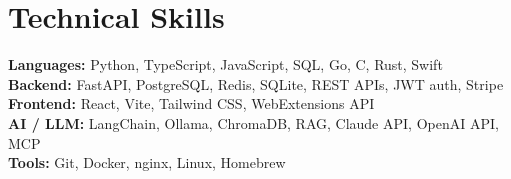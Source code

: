 \documentclass[letterpaper,10pt]{article}
\begin{document}
\section{Technical Skills}
 \begin{itemize}[leftmargin=0.15in, label={}]
    \small{\item{
     \textbf{Languages:}{ Python, TypeScript, JavaScript, SQL, Go, C, Rust, Swift} \\
     \textbf{Backend:}{ FastAPI, PostgreSQL, Redis, SQLite, REST APIs, JWT auth, Stripe} \\
     \textbf{Frontend:}{ React, Vite, Tailwind CSS, WebExtensions API} \\
     \textbf{AI / LLM:}{ LangChain, Ollama, ChromaDB, RAG, Claude API, OpenAI API, MCP} \\
     \textbf{Tools:}{ Git, Docker, nginx, Linux, Homebrew}
    }}
 \end{itemize}

\end{document}
